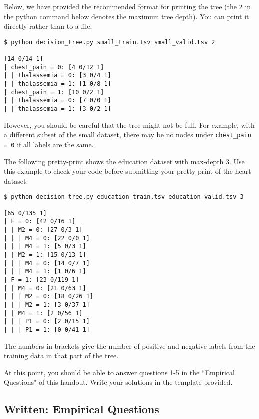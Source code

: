 Below, we have provided the recommended format for printing the tree (the \texttt{2} in the python command below denotes the maximum tree depth). You can print it directly rather than to a file. 

\begin{lstlisting}[language=Shell]
$ python decision_tree.py small_train.tsv small_valid.tsv 2

[14 0/14 1]
| chest_pain = 0: [4 0/12 1]
| | thalassemia = 0: [3 0/4 1]
| | thalassemia = 1: [1 0/8 1]
| chest_pain = 1: [10 0/2 1]
| | thalassemia = 0: [7 0/0 1]
| | thalassemia = 1: [3 0/2 1]
\end{lstlisting}


However, you should be careful that the tree might not be full. For example, with a different subset of the small dataset, there may be no nodes under \lstinline{chest_pain = 0} if all labels are the same.

The following pretty-print shows the education dataset with max-depth 3.  Use this example to check your code before submitting your pretty-print of the heart dataset.

\begin{lstlisting}[language=Shell]
$ python decision_tree.py education_train.tsv education_valid.tsv 3

[65 0/135 1]
| F = 0: [42 0/16 1]
| | M2 = 0: [27 0/3 1]
| | | M4 = 0: [22 0/0 1]
| | | M4 = 1: [5 0/3 1]
| | M2 = 1: [15 0/13 1]
| | | M4 = 0: [14 0/7 1]
| | | M4 = 1: [1 0/6 1]
| F = 1: [23 0/119 1]
| | M4 = 0: [21 0/63 1]
| | | M2 = 0: [18 0/26 1]
| | | M2 = 1: [3 0/37 1]
| | M4 = 1: [2 0/56 1]
| | | P1 = 0: [2 0/15 1]
| | | P1 = 1: [0 0/41 1]
\end{lstlisting}

The numbers in brackets give the number of positive and negative labels from the training data in that part of the tree.

\begin{notebox}
At this point, you should be able to answer questions 1-5 in the ``Empirical Questions" of this handout.  Write your solutions in the template provided. 
\end{notebox}


\subsection{Written: Empirical Questions}
\label{sec:empirical questions}

